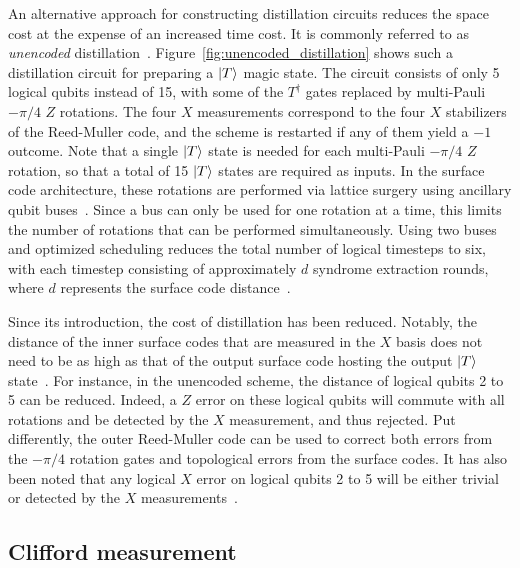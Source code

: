 \documentclass[%
 reprint,
superscriptaddress,
 amsmath,amssymb,
 aps,
]{revtex4-2}
\begin{document}
An alternative approach for constructing distillation circuits reduces the space cost at the expense of an increased time cost. It is commonly referred to as \textit{unencoded} distillation~\cite{haah2018codes,litinski2019magic}. Figure~\ref{fig:unencoded_distillation} shows such a distillation circuit for preparing a $\ket{T}$ magic state. The circuit consists of only 5 logical qubits instead of 15, with some of the $T^\dagger$ gates replaced by multi-Pauli $-\pi/4$ $Z$ rotations. The four $X$ measurements correspond to the four $X$ stabilizers of the Reed-Muller code, and the scheme is restarted if any of them yield a $-1$ outcome. Note that a single $\ket{T}$ state is needed for each multi-Pauli $-\pi/4$ $Z$ rotation, so that a total of 15 $\ket{T}$ states are required as inputs. In the surface code architecture, these rotations are performed via lattice surgery using ancillary qubit buses~\cite{horsman2012surface,fowler2018low,litinski2019game}. Since a bus can only be used for one rotation at a time, this limits the number of rotations that can be performed simultaneously. Using two buses and optimized scheduling reduces the total number of logical timesteps to six, with each timestep consisting of approximately $d$ syndrome extraction rounds, where $d$ represents the surface code distance~\cite{litinski2019magic}.

Since its introduction, the cost of distillation has been reduced. Notably, the distance of the inner surface codes that are measured in the $X$ basis does not need to be as high as that of the output surface code hosting the output $\ket{T}$ state~\cite{litinski2019magic}. For instance, in the unencoded scheme, the distance of logical qubits 2 to 5 can be reduced. Indeed, a $Z$ error on these logical qubits will commute with all rotations and be detected by the $X$ measurement, and thus rejected. Put differently, the outer Reed-Muller code can be used to correct both errors from the $-\pi/4$ rotation gates and topological errors from the surface codes. It has also been noted that any logical $X$ error on logical qubits 2 to 5 will be either trivial or detected by the $X$ measurements~\cite{lee2024low}.

\subsection{Clifford measurement}
\end{document}
